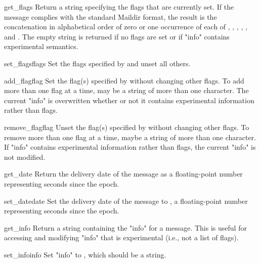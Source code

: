 \begin{methoddesc}{get_flags}{}
Return a string specifying the flags that are currently set. If the message
complies with the standard Maildir format, the result is the concatenation in
alphabetical order of zero or one occurrence of each of ,
, , , , and .
The empty string is returned if no flags are set or if "info" contains
experimental semantics.
\end{methoddesc}

\begin{methoddesc}{set_flags}{flags}
Set the flags specified by  and unset all others.
\end{methoddesc}

\begin{methoddesc}{add_flag}{flag}
Set the flag(s) specified by  without changing other flags. To add
more than one flag at a time,  may be a string of more than one
character. The current "info" is overwritten whether or not it contains
experimental information rather than
flags.
\end{methoddesc}

\begin{methoddesc}{remove_flag}{flag}
Unset the flag(s) specified by  without changing other flags. To
remove more than one flag at a time,  maybe a string of more than one
character. If "info" contains experimental information rather than flags, the
current "info" is not modified.
\end{methoddesc}

\begin{methoddesc}{get_date}{}
Return the delivery date of the message as a floating-point number representing
seconds since the epoch.
\end{methoddesc}

\begin{methoddesc}{set_date}{date}
Set the delivery date of the message to , a floating-point number
representing seconds since the epoch.
\end{methoddesc}

\begin{methoddesc}{get_info}{}
Return a string containing the "info" for a message. This is useful for
accessing and modifying "info" that is experimental (i.e., not a list of
flags).
\end{methoddesc}

\begin{methoddesc}{set_info}{info}
Set "info" to , which should be a string.
\end{methoddesc}

